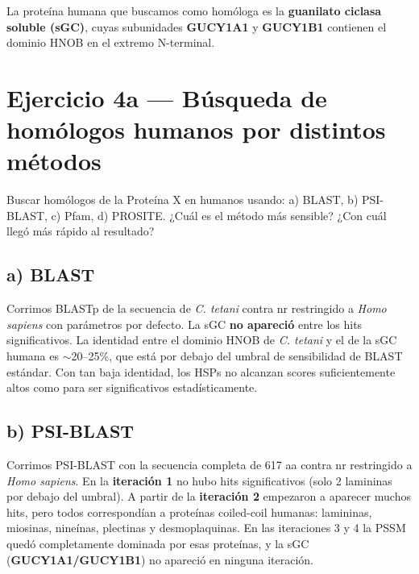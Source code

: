 
La proteína humana que buscamos como homóloga es la \textbf{guanilato ciclasa soluble (sGC)},
cuyas subunidades \textbf{GUCY1A1} y \textbf{GUCY1B1} contienen el dominio HNOB en el
extremo N-terminal.

\section{Ejercicio 4a --- Búsqueda de homólogos humanos por distintos métodos}

\begin{consigna}
Buscar homólogos de la Proteína X en humanos usando: a) BLAST, b) PSI-BLAST, c) Pfam,
d) PROSITE. ¿Cuál es el método más sensible? ¿Con cuál llegó más rápido al resultado?
\end{consigna}

\subsection{a) BLAST}

Corrimos BLASTp de la secuencia de \textit{C. tetani} contra nr restringido a
\textit{Homo sapiens} con parámetros por defecto. La sGC \textbf{no apareció} entre los
hits significativos. La identidad entre el dominio HNOB de \textit{C. tetani} y el de la
sGC humana es $\sim$20--25\%, que está por debajo del umbral de sensibilidad de BLAST
estándar. Con tan baja identidad, los HSPs no alcanzan scores suficientemente altos como
para ser significativos estadísticamente.

\subsection{b) PSI-BLAST}

Corrimos PSI-BLAST con la secuencia completa de 617 aa contra nr restringido a \textit{Homo
sapiens}. En la \textbf{iteración 1} no hubo hits significativos (solo 2 lamininas por debajo
del umbral). A partir de la \textbf{iteración 2} empezaron a aparecer muchos hits, pero todos
correspondían a proteínas coiled-coil humanas: lamininas, miosinas, nineínas, plectinas y
desmoplaquinas. En las iteraciones 3 y 4 la PSSM quedó completamente dominada por esas
proteínas, y la sGC (\textbf{GUCY1A1/GUCY1B1}) no apareció en ninguna iteración.

